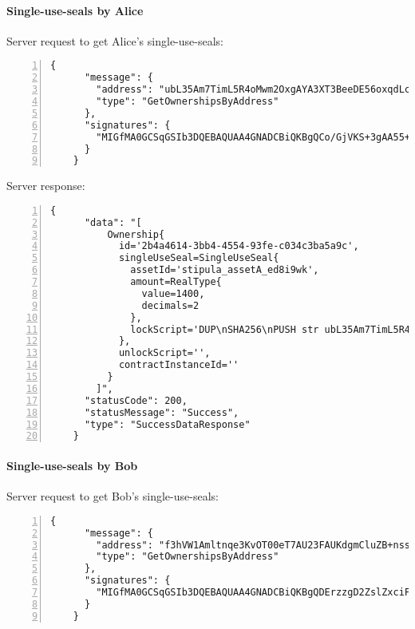 \paragraph{Single-use-seals by Alice}

Server request to get Alice's single-use-seals:
{
  \small
  \begin{Verbatim}[numbers=left,xleftmargin=1cm,firstnumber=1,breaklines=true,breakanywhere=true,tabsize=2]
    {
      "message": {
        "address": "ubL35Am7TimL5R4oMwm2OxgAYA3XT3BeeDE56oxqdLc=",
        "type": "GetOwnershipsByAddress"
      },
      "signatures": {
        "MIGfMA0GCSqGSIb3DQEBAQUAA4GNADCBiQKBgQCo/GjVKS+3gAA55+kko41yINdOcCLQMSBQyuTTkKHE1mhu/TgOpivM0wLPsSga8hQMr3+v3aR0IF/vfCRf6SdiXmWx/jflmEXtnT6fkGcnV6dGNUpHWXSpwUIDt0N88jfnEqekx4S+KDCKg99sGEeHeT65fKS8lB0gjHMt9AOriwIDAQAB": "MomZTc63z7PfH35c1dL4tjXebcsW+0Zxl0nP1NQdcUFws98DX+bMWI7L0C6IO5lxvkYve4zdio1Crn97FXvngK4aVfiEZEnHOJ0tstq7uQYGErM3DDAABqPq8HH5yoKnLST2LWpO0oD8G/VXvIE6qMT5D34W1Ci0q4uh+7y3EcY="
      }
    }
  \end{Verbatim}
}

Server response:
{
  \small
  \begin{Verbatim}[numbers=left,xleftmargin=1cm,firstnumber=1,breaklines=true,breakanywhere=true,tabsize=2]
    {
      "data": "[
          Ownership{
            id='2b4a4614-3bb4-4554-93fe-c034c3ba5a9c', 
            singleUseSeal=SingleUseSeal{
              assetId='stipula_assetA_ed8i9wk', 
              amount=RealType{
                value=1400, 
                decimals=2
              }, 
              lockScript='DUP\nSHA256\nPUSH str ubL35Am7TimL5R4oMwm2OxgAYA3XT3BeeDE56oxqdLc=\nEQUAL\nCHECKSIG\nHALT\n'
            }, 
            unlockScript='', 
            contractInstanceId=''
          }
        ]",
      "statusCode": 200,
      "statusMessage": "Success",
      "type": "SuccessDataResponse"
    }
  \end{Verbatim}
}

\paragraph{Single-use-seals by Bob}

Server request to get Bob's single-use-seals:
{
  \small
  \begin{Verbatim}[numbers=left,xleftmargin=1cm,firstnumber=1,breaklines=true,breakanywhere=true,tabsize=2]
    {
      "message": {
        "address": "f3hVW1Amltnqe3KvOT00eT7AU23FAUKdgmCluZB+nss=",
        "type": "GetOwnershipsByAddress"
      },
      "signatures": {
        "MIGfMA0GCSqGSIb3DQEBAQUAA4GNADCBiQKBgQDErzzgD2ZslZxciFAiX3/ot7lrkZDw4148jFZrsDZPE6CVs9xXFSHGgy/mFvIFLXhnChO6Nyd2be3lbgeavLMCMVUiTStXr117Km17keWpb3sItkKKsLFBOcIIU8XXowI/OhzQN2XPZYESHgjdQ5vwEj2YyueiS7WKP94YWz/pswIDAQAB": "hSNodnUyusffNlv+KNq4605pFvqh91pVspFhTgbmWccE/LKM6h4bedpvTgMHoVDezvA7v2XTzmLG5eL3lOeA6I2xJMH32DcV60IPSoh61oVHnwPQcQHY039D4y5VSJ0GMQJKIcTEq3fqIdabg7261xUaegHUnXrcyynh9GpMJxk="
      }
    }
  \end{Verbatim}
}

